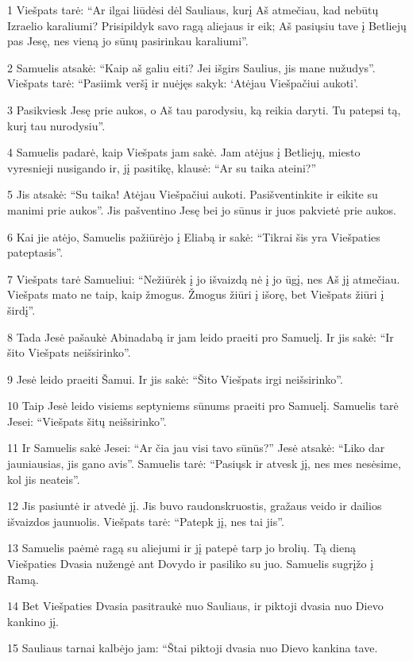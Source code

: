 \par 1 Viešpats tarė: “Ar ilgai liūdėsi dėl Sauliaus, kurį Aš atmečiau, kad nebūtų Izraelio karaliumi? Prisipildyk savo ragą aliejaus ir eik; Aš pasiųsiu tave į Betliejų pas Jesę, nes vieną jo sūnų pasirinkau karaliumi”. 
\par 2 Samuelis atsakė: “Kaip aš galiu eiti? Jei išgirs Saulius, jis mane nužudys”. Viešpats tarė: “Pasiimk veršį ir nuėjęs sakyk: ‘Atėjau Viešpačiui aukoti’. 
\par 3 Pasikviesk Jesę prie aukos, o Aš tau parodysiu, ką reikia daryti. Tu patepsi tą, kurį tau nurodysiu”. 
\par 4 Samuelis padarė, kaip Viešpats jam sakė. Jam atėjus į Betliejų, miesto vyresnieji nusigando ir, jį pasitikę, klausė: “Ar su taika ateini?” 
\par 5 Jis atsakė: “Su taika! Atėjau Viešpačiui aukoti. Pasišventinkite ir eikite su manimi prie aukos”. Jis pašventino Jesę bei jo sūnus ir juos pakvietė prie aukos. 
\par 6 Kai jie atėjo, Samuelis pažiūrėjo į Eliabą ir sakė: “Tikrai šis yra Viešpaties pateptasis”. 
\par 7 Viešpats tarė Samueliui: “Nežiūrėk į jo išvaizdą nė į jo ūgį, nes Aš jį atmečiau. Viešpats mato ne taip, kaip žmogus. Žmogus žiūri į išorę, bet Viešpats žiūri į širdį”. 
\par 8 Tada Jesė pašaukė Abinadabą ir jam leido praeiti pro Samuelį. Ir jis sakė: “Ir šito Viešpats neišsirinko”. 
\par 9 Jesė leido praeiti Šamui. Ir jis sakė: “Šito Viešpats irgi neišsirinko”. 
\par 10 Taip Jesė leido visiems septyniems sūnums praeiti pro Samuelį. Samuelis tarė Jesei: “Viešpats šitų neišsirinko”. 
\par 11 Ir Samuelis sakė Jesei: “Ar čia jau visi tavo sūnūs?” Jesė atsakė: “Liko dar jauniausias, jis gano avis”. Samuelis tarė: “Pasiųsk ir atvesk jį, nes mes nesėsime, kol jis neateis”. 
\par 12 Jis pasiuntė ir atvedė jį. Jis buvo raudonskruostis, gražaus veido ir dailios išvaizdos jaunuolis. Viešpats tarė: “Patepk jį, nes tai jis”. 
\par 13 Samuelis paėmė ragą su aliejumi ir jį patepė tarp jo brolių. Tą dieną Viešpaties Dvasia nužengė ant Dovydo ir pasiliko su juo. Samuelis sugrįžo į Ramą. 
\par 14 Bet Viešpaties Dvasia pasitraukė nuo Sauliaus, ir piktoji dvasia nuo Dievo kankino jį. 
\par 15 Sauliaus tarnai kalbėjo jam: “Štai piktoji dvasia nuo Dievo kankina tave. 
